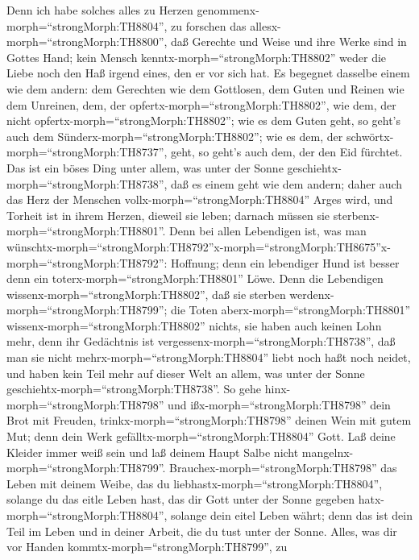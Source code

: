 Denn ich habe solches alles zu Herzen
genommenx-morph=``strongMorph:TH8804'', zu forschen das
allesx-morph=``strongMorph:TH8800'', daß Gerechte und Weise und ihre
Werke sind in Gottes Hand; kein Mensch
kenntx-morph=``strongMorph:TH8802'' weder die Liebe noch den Haß irgend
eines, den er vor sich hat.  Es begegnet dasselbe einem wie
dem andern: dem Gerechten wie dem Gottlosen, dem Guten und Reinen wie
dem Unreinen, dem, der opfertx-morph=``strongMorph:TH8802'', wie dem,
der nicht opfertx-morph=``strongMorph:TH8802''; wie es dem Guten geht,
so geht's auch dem Sünderx-morph=``strongMorph:TH8802''; wie es dem, der
schwörtx-morph=``strongMorph:TH8737'', geht, so geht's auch dem, der den
Eid fürchtet.  Das ist ein böses Ding unter allem, was unter
der Sonne geschiehtx-morph=``strongMorph:TH8738'', daß es einem geht wie
dem andern; daher auch das Herz der Menschen
vollx-morph=``strongMorph:TH8804'' Arges wird, und Torheit ist in ihrem
Herzen, dieweil sie leben; darnach müssen sie
sterbenx-morph=``strongMorph:TH8801''.  Denn bei allen
Lebendigen ist, was man
wünschtx-morph=``strongMorph:TH8792''\textbar x-morph=``strongMorph:TH8675''x-morph=``strongMorph:TH8792'':
Hoffnung; denn ein lebendiger Hund ist besser denn ein
toterx-morph=``strongMorph:TH8801'' Löwe.  Denn die
Lebendigen wissenx-morph=``strongMorph:TH8802'', daß sie sterben
werdenx-morph=``strongMorph:TH8799''; die Toten
aberx-morph=``strongMorph:TH8801'' wissenx-morph=``strongMorph:TH8802''
nichts, sie haben auch keinen Lohn mehr, denn ihr Gedächtnis ist
vergessenx-morph=``strongMorph:TH8738'',  daß man sie nicht
mehrx-morph=``strongMorph:TH8804'' liebt noch haßt noch neidet, und
haben kein Teil mehr auf dieser Welt an allem, was unter der Sonne
geschiehtx-morph=``strongMorph:TH8738''.  So gehe
hinx-morph=``strongMorph:TH8798'' und ißx-morph=``strongMorph:TH8798''
dein Brot mit Freuden, trinkx-morph=``strongMorph:TH8798'' deinen Wein
mit gutem Mut; denn dein Werk gefälltx-morph=``strongMorph:TH8804''
Gott.  Laß deine Kleider immer weiß sein und laß deinem
Haupt Salbe nicht mangelnx-morph=``strongMorph:TH8799''. 
Brauchex-morph=``strongMorph:TH8798'' das Leben mit deinem Weibe, das du
liebhastx-morph=``strongMorph:TH8804'', solange du das eitle Leben hast,
das dir Gott unter der Sonne gegeben hatx-morph=``strongMorph:TH8804'',
solange dein eitel Leben währt; denn das ist dein Teil im Leben und in
deiner Arbeit, die du tust unter der Sonne.  Alles, was dir
vor Handen kommtx-morph=``strongMorph:TH8799'', zu
